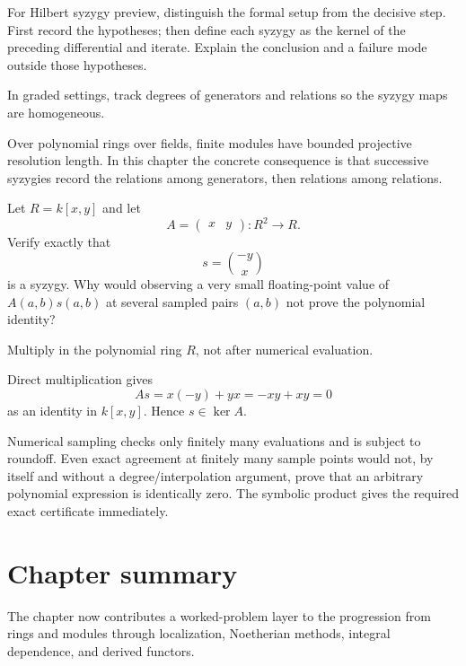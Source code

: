 \begin{exercise}\label{exr:v24-08}
For Hilbert syzygy preview, distinguish the formal setup from the decisive step. First record the hypotheses; then define each syzygy as the kernel of the preceding differential and iterate. Explain the conclusion and a failure mode outside those hypotheses.
\end{exercise}
\begin{hint}
In graded settings, track degrees of generators and relations so the syzygy maps are homogeneous.
\end{hint}
\begin{solution}
Over polynomial rings over fields, finite modules have bounded projective resolution length. In this chapter the concrete consequence is that successive syzygies record the relations among generators, then relations among relations.
\end{solution}

\begin{exercise}\label{exr:v24-exact-syzygy-01}
Let \(R=k[x,y]\) and let
\[
A=
\begin{pmatrix}
x&y
\end{pmatrix}:R^2\to R.
\]
Verify exactly that
\[
s=
\binom{-y}{x}
\]
is a syzygy.  Why would observing a very small floating-point value of
\(A(a,b)s(a,b)\) at several sampled pairs \((a,b)\) not prove the polynomial
identity?
\end{exercise}
\begin{hint}
Multiply in the polynomial ring \(R\), not after numerical evaluation.
\end{hint}
\begin{solution}
Direct multiplication gives
\[
As=x(-y)+yx=-xy+xy=0
\]
as an identity in \(k[x,y]\).  Hence \(s\in\ker A\).

Numerical sampling checks only finitely many evaluations and is subject to
roundoff.  Even exact agreement at finitely many sample points would not, by
itself and without a degree/interpolation argument, prove that an arbitrary
polynomial expression is identically zero.  The symbolic product gives the
required exact certificate immediately.
\end{solution}

\section*{Chapter summary}
The chapter now contributes a worked-problem layer to the progression from rings and modules through localization, Noetherian methods, integral dependence, and derived functors.
